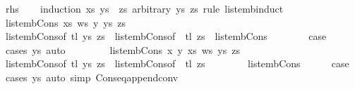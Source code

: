\begin{isabellebody}
\ {\isacharquery}rhs\isanewline
\ \ \isamarkupfalse%
\ {\isacharparenleft}induction\ xs\ {\isachardoublequoteopen}ys\ {\isacharat}\ zs{\isachardoublequoteclose}\ arbitrary{\isacharcolon}\ ys\ zs\ rule{\isacharcolon}\ list{\isacharunderscore}emb{\isachardot}induct{\isacharparenright}\isanewline
\ \ \ \ \isamarkupfalse%
\ {\isacharparenleft}list{\isacharunderscore}emb{\isacharunderscore}Cons\ xs\ ws\ y\ ys\ zs{\isacharparenright}\isanewline
\ \ \ \ \isamarkupfalse%
\ list{\isacharunderscore}emb{\isacharunderscore}Cons{\isacharparenleft}{}{\isacharparenright}{\isacharbrackleft}of\ {\isachardoublequoteopen}tl\ ys{\isachardoublequoteclose}\ zs{\isacharbrackright}\ \ list{\isacharunderscore}emb{\isacharunderscore}Cons{\isacharparenleft}{}{\isacharparenright}{\isacharbrackleft}of\ {\isachardoublequoteopen}{\isacharbrackleft}{\isacharbrackright}{\isachardoublequoteclose}\ {\isachardoublequoteopen}tl\ zs{\isachardoublequoteclose}{\isacharbrackright}\ \ list{\isacharunderscore}emb{\isacharunderscore}Cons{\isacharparenleft}{}{\isacharcomma}{}{\isacharparenright}\isanewline
\ \ \ \ \ \ \isamarkupfalse%
\ {\isacharquery}case\ \isamarkupfalse%
\ {\isacharparenleft}cases\ ys{\isacharparenright}\ auto\isanewline
\ \ \isamarkupfalse%
\isanewline
\ \ \ \ \isamarkupfalse%
\ {\isacharparenleft}list{\isacharunderscore}emb{\isacharunderscore}Cons{}\ x\ y\ xs\ ws\ ys\ zs{\isacharparenright}\isanewline
\ \ \ \ \isamarkupfalse%
\ list{\isacharunderscore}emb{\isacharunderscore}Cons{}{\isacharparenleft}{}{\isacharparenright}{\isacharbrackleft}of\ {\isachardoublequoteopen}tl\ ys{\isachardoublequoteclose}\ zs{\isacharbrackright}\ \ list{\isacharunderscore}emb{\isacharunderscore}Cons{}{\isacharparenleft}{}{\isacharparenright}{\isacharbrackleft}of\ {\isachardoublequoteopen}{\isacharbrackleft}{\isacharbrackright}{\isachardoublequoteclose}\ {\isachardoublequoteopen}tl\ zs{\isachardoublequoteclose}{\isacharbrackright}\isanewline
\ \ \ \ \ \ \ \ list{\isacharunderscore}emb{\isacharunderscore}Cons{}{\isacharparenleft}{}{\isacharcomma}{}{\isacharcomma}{}{\isacharparenright}\isanewline
\ \ \ \ \isamarkupfalse%
\ {\isacharquery}case\ \isamarkupfalse%
\ {\isacharparenleft}cases\ ys{\isacharparenright}\ {\isacharparenleft}auto\ simp{\isacharcolon}\ Cons{\isacharunderscore}eq{\isacharunderscore}append{\isacharunderscore}conv{\isacharparenright}\isanewline

\end{isabellebody}
